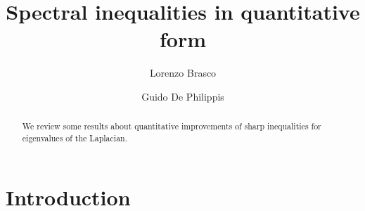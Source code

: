 \documentclass{amsart}
\author[Brasco]{Lorenzo Brasco}
\author[De Philippis]{Guido De Philippis}
\title{Spectral inequalities in quantitative form}
\theoremstyle{definition}
\numberwithin{equation}{section}
\begin{document}
\begin{abstract}
We review some results about quantitative improvements of sharp inequalities for eigenvalues of the Laplacian.
\end{abstract}


\maketitle

\begin{center}
\begin{minipage}{11cm}
\small
\tableofcontents
\end{minipage}
\end{center}



\section{Introduction}
\end{document}
